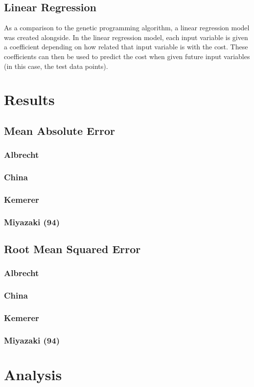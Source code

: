 \documentclass[12pt]{article}
\begin{document}
\subsection{Linear Regression}
As a comparison to the genetic programming algorithm, a linear regression model was created alongside. In the linear regression model, each input variable is given a coefficient depending on how related that input variable is with the cost. These coefficients can then be used to predict the cost when given future input variables (in this case, the test data points).

\newpage
\section{Results}
\subsection{Mean Absolute Error}
\subsubsection{Albrecht}
\subsubsection{China}
\subsubsection{Kemerer}
\subsubsection{Miyazaki (94)}

\subsection{Root Mean Squared Error}
\subsubsection{Albrecht}
\subsubsection{China}



\subsubsection{Kemerer}
\subsubsection{Miyazaki (94)}

\newpage
\section{Analysis}
\end{document}
